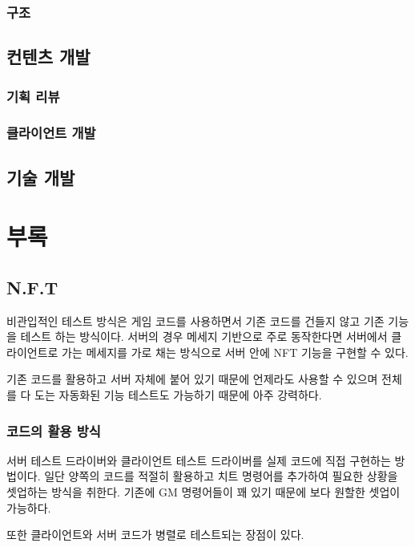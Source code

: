 \documentclass[chapter,kosection, 10.5pt, romanfixed, a4paper]{oblivoir}
\begin{document}
\subsection{구조}


\section{컨텐츠 개발}

\subsection{기획 리뷰}

\subsection{클라이언트 개발}


\section{기술 개발}

\chapter{부록}

\section{N.F.T}

비관입적인 테스트 방식은 게임 코드를 사용하면서 기존 코드를 건들지 않고 기존 기능을 
테스트 하는 방식이다. 서버의 경우 메세지 기반으로 주로 동작한다면 서버에서 클라이언트로 
가는 메세지를 가로 채는 방식으로 서버 안에 NFT 기능을 구현할 수 있다. 

기존 코드를 활용하고 서버 자체에 붙어 있기 때문에 언제라도 사용할 수 있으며 
전체를 다 도는 자동화된 기능 테스트도 가능하기 때문에 아주 강력하다. 

\subsection{코드의 활용 방식}

서버 테스트 드라이버와 클라이언트 테스트 드라이버를 실제 코드에 직접 구현하는 방법이다. 
일단 양쪽의 코드를 적절히 활용하고 치트 명령어를 추가하여 필요한 상황을 셋업하는 방식을 취한다. 
기존에 GM 명령어들이 꽤 있기 때문에 보다 원할한 셋업이 가능하다. 

또한 클라이언트와 서버 코드가 병렬로 테스트되는 장점이 있다. 
\end{document}
